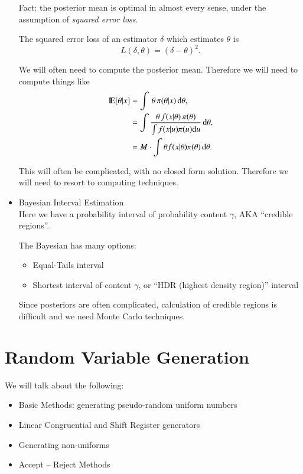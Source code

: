 \documentclass[captions=tableheading]{scrbook}
\begin{document}
\begin{itemize}
Fact: the posterior mean is optimal in almost every sense, under the assumption of \emph{squared error loss}.

The squared error loss of an estimator $\delta$ which estimates $\theta$ is 
\[
L(\delta,\theta) = (\delta - \theta)^{2}.
\]

We will often need to compute the posterior mean.  Therefore we will need to compute things like
\begin{align*}
\mathrm{I\hspace{-1.5pt}E} [\theta|x] &= \int \, \theta\, \pi(\theta|x)\,\mathrm{d} \theta,  \\
&= \int \frac{\theta\, f(x|\theta)\,\pi(\theta)}{\int f(x|u)\pi(u)\mathrm{d} u} \,\mathrm{d} \theta, \\
&= M \cdot \int \theta f(x|\theta)\pi(\theta)\,\mathrm{d} \theta.
\end{align*}

This will often be complicated, with no closed form solution.  Therefore we will need to resort to computing techniques.


\item Bayesian Interval Estimation\\
\label{sec-1_3_2_3}%
Here we have a probability interval of probability content $\gamma$, AKA ``credible regions''.

The Bayesian has many options:


\begin{itemize}
\item Equal-Tails interval
\item Shortest interval of content $\gamma$, or ``HDR (highest density region)'' interval
\end{itemize}

Since posteriors are often complicated, calculation of credible regions is difficult and we need Monte Carlo techniques.


\end{itemize} %
\chapter{Random Variable Generation}
\label{sec-2}

We will talk about the following:


\begin{itemize}
\item Basic Methods: generating pseudo-random uniform numbers
\item Linear Congruential and Shift Register generators
\item Generating non-uniforms
\item Accept – Reject Methods
\end{itemize}
\end{document}
